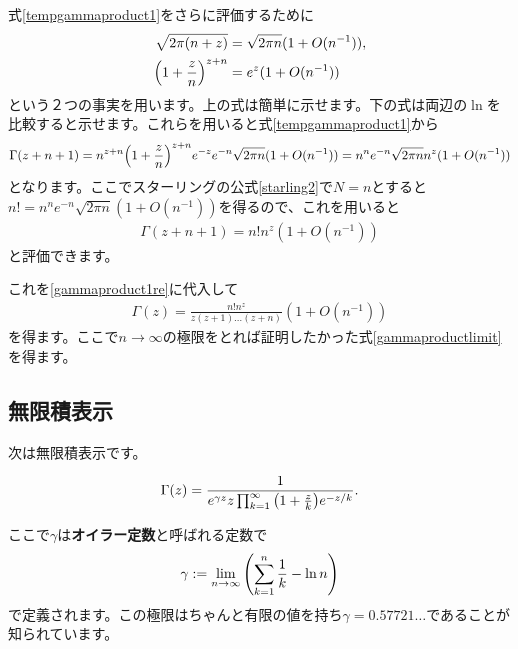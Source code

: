 \documentclass[report,paper=a4, fontsize=12pt, line_length=16cm, number_of_lines=33,dvipdfmx]{jlreq}
\newenvironment{important}{\begin{tcolorbox}[
  colback = white,
  colframe = red!35,
  boxrule = 2mm,
  fonttitle = \bfseries,
  after = \noindent] }{\end{tcolorbox}}
\numberwithin{equation}{section}
\newcommand{\strong}[1]{\textsf{\bfseries #1}}
\begin{document}
式\eqref{tempgammaproduct1}をさらに評価するために
\begin{align}
  \sqrt{2\pi(n+z)}&=\sqrt{2\pi n}(1+O(n^{-1})),\\
  \qty(1+\frac{z}{n})^{z+n}&=e^{z}(1+O(n^{-1}))
\end{align}
という２つの事実を用います。上の式は簡単に示せます。下の式は両辺の$\ln$を比較すると示せます。これらを用いると式\eqref{tempgammaproduct1}から
\begin{align}
  \Gamma(z+n+1)=n^{z+n}\qty(1+\frac{z}{n})^{z+n}e^{-z}e^{-n}\sqrt{2\pi n}(1+O(n^{-1}))
  =n^n e^{-n}\sqrt{2\pi n}n^z(1+O(n^{-1}))
\end{align}
となります。ここでスターリングの公式\eqref{starling2}で$N=n$とすると$n!=n^ne^{-n}\sqrt{2\pi n}(1+O(n^{-1}))$を得るので、これを用いると
\begin{align}
  \Gamma(z+n+1)=n!n^z(1+O(n^{-1}))
\end{align}
と評価できます。

これを\eqref{gammaproduct1re}に代入して
\begin{align}
  \Gamma(z)=\frac{n!n^z}{z(z+1)\dots (z+n)} (1+O(n^{-1}))
\end{align}
を得ます。ここで$n\to\infty$の極限をとれば証明したかった式\eqref{gammaproductlimit}を得ます。


\subsection{無限積表示}
次は無限積表示です。
\begin{important}
  \begin{align}
    \Gamma(z)=\frac{1}{e^{\gamma z}z \prod_{k=1}^{\infty}\qty(1+\frac{z}{k})e^{-z/k} }.  \label{gammainfiniteproduct}  
  \end{align}
\end{important}
ここで$\gamma$は\strong{オイラー定数}と呼ばれる定数で
\begin{align}
  \gamma:=\lim_{n\to\infty}\qty(\sum_{k=1}^{n}\frac{1}{k}-\ln n)\label{defeulerconst}
\end{align}
で定義されます。この極限はちゃんと有限の値を持ち$\gamma=0.57721\dots$であることが知られています。
\end{document}
